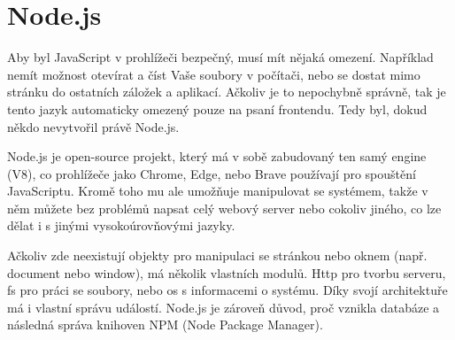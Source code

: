 \section{Node.js}

Aby byl JavaScript v prohlížeči bezpečný, musí mít nějaká omezení. Například nemít možnost otevírat a číst Vaše soubory v počítači, nebo se dostat mimo stránku do ostatních záložek a aplikací. Ačkoliv je to nepochybně správně, tak je tento jazyk automaticky omezený pouze na psaní frontendu. Tedy byl, dokud někdo nevytvořil právě Node.js.\cite{NodeJS}

Node.js je open-source projekt, který má v sobě zabudovaný ten samý engine (V8), co prohlížeče jako Chrome, Edge, nebo Brave používají pro spouštění JavaScriptu. Kromě toho mu ale umožňuje manipulovat se systémem, takže v něm můžete bez problémů napsat celý webový server nebo cokoliv jiného, co lze dělat i s jinými vysokoúrovňovými jazyky.\cite{NodejsWiki}

Ačkoliv zde neexistují objekty pro manipulaci se stránkou nebo oknem (např. document nebo window), má několik vlastních modulů. Http pro tvorbu serveru, fs pro práci se soubory, nebo os s informacemi o systému. Díky svojí architektuře má i vlastní správu událostí. Node.js je zároveň důvod, proč vznikla databáze a následná správa knihoven NPM (Node Package Manager).